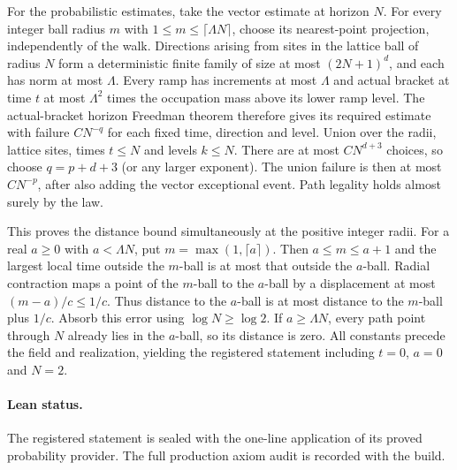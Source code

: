 For the probabilistic estimates, take the vector estimate at horizon $N$.
For every integer ball radius $m$ with $1\leq m\leq\lceil\Lambda N\rceil$,
choose its nearest-point projection, independently of the walk. Directions
arising from sites in the lattice ball of radius $N$ form a deterministic
finite family of size at most $(2N+1)^d$, and each has norm at most $\Lambda$.
Every ramp has increments at most $\Lambda$ and actual bracket at time $t$
at most $\Lambda^2$ times the occupation mass above its lower ramp level.
The actual-bracket horizon Freedman theorem therefore gives its required
estimate with failure $C N^{-q}$ for each fixed time, direction and level.
Union over the radii, lattice sites, times $t\leq N$ and levels $k\leq N$.
There are at most $C N^{d+3}$ choices, so choose $q=p+d+3$ (or any larger
exponent). The union failure is then at most $C N^{-p}$, after also adding
the vector exceptional event. Path legality holds almost surely by the law.

This proves the distance bound simultaneously at the positive integer radii.
For a real $a\geq0$ with $a<\Lambda N$, put $m=\max(1,\lceil a\rceil)$.
Then $a\leq m\leq a+1$ and the largest local time outside the $m$-ball is
at most that outside the $a$-ball. Radial contraction maps a point of the
$m$-ball to the $a$-ball by a displacement at most $(m-a)/c\leq1/c$.
Thus distance to the $a$-ball is at most distance to the $m$-ball plus $1/c$.
Absorb this error using $\log N\geq\log2$. If $a\geq\Lambda N$, every
path point through $N$ already lies in the $a$-ball, so its distance is zero.
All constants precede the field and realization, yielding the registered
statement including $t=0$, $a=0$ and $N=2$.
\paragraph{Lean status.}
The registered statement is sealed with the one-line application of its proved probability provider. The full production axiom audit is recorded with the build.
